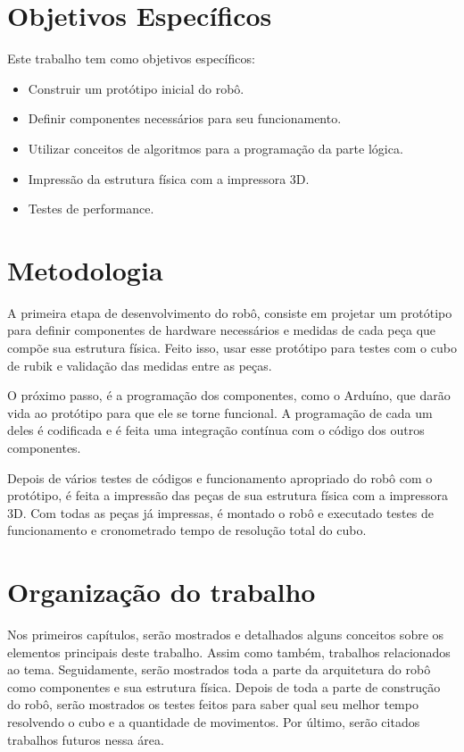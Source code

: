 \section{Objetivos Específicos} 

Este trabalho tem como objetivos específicos:

\begin{itemize}
  \item Construir um protótipo inicial do robô.
  \item Definir componentes necessários para seu funcionamento.
  \item Utilizar conceitos de algoritmos para a programação da parte lógica.
  \item Impressão da estrutura física com a impressora 3D.
  \item Testes de performance.
\end{itemize}

\section{Metodologia}

A primeira etapa de desenvolvimento do robô, consiste em projetar um protótipo para definir componentes de hardware necessários e medidas de cada peça que compõe sua estrutura física. Feito isso, usar esse protótipo para testes com o cubo de rubik e validação das medidas entre as peças.

O próximo passo, é a programação dos componentes, como o Arduíno, que darão vida ao protótipo para que ele se torne funcional. A programação de cada um deles é codificada e é feita uma integração contínua com o código dos outros componentes. 

    Depois de vários testes de códigos e funcionamento apropriado do robô com o protótipo, é feita a impressão das peças de sua estrutura física com a impressora 3D. Com todas as peças já impressas, é montado o robô e executado testes de funcionamento e cronometrado tempo de resolução total do cubo.


\section{Organização do trabalho}

 Nos primeiros capítulos, serão mostrados e detalhados alguns conceitos sobre os elementos principais deste trabalho. Assim como também, trabalhos relacionados ao tema. Seguidamente, serão mostrados toda a parte da arquitetura do robô como componentes e sua estrutura física. Depois de toda a parte de construção do robô, serão mostrados os testes feitos para saber qual seu melhor tempo resolvendo o cubo e a quantidade de movimentos. Por último, serão citados trabalhos futuros nessa área. 
 
 
 
 
 
